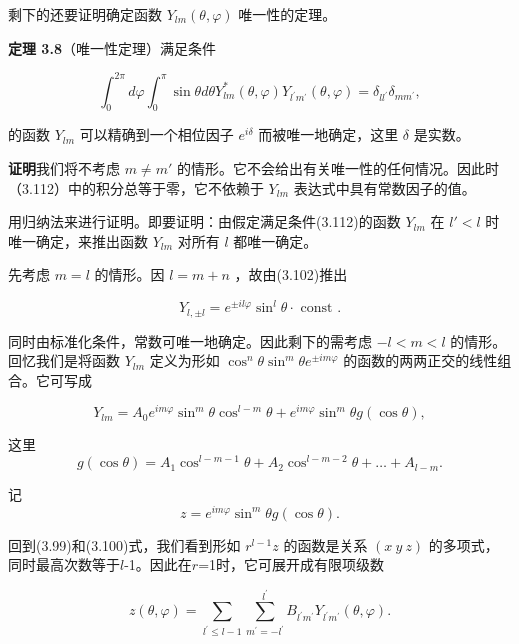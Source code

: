 剩下的还要证明确定函数 $Y_{lm}(\theta, \varphi)$ 唯一性的定理。

\textbf{定理 3.8}\quad （唯一性定理）满足条件

\begin{equation*}
\int_ {0} ^ {2 \pi} d \varphi \int_ {0} ^ {\pi} \sin \theta d \theta Y _ {l m} ^ {*} (\theta , \varphi) Y _ {l ^ {\prime} m ^ {\prime}} (\theta , \varphi) = \delta_ {l l ^ {\prime}} \delta_ {m m ^ {\prime}},\tag{3.112}
\end{equation*}

的函数 $Y_{lm}$ 可以精确到一个相位因子 $e^{i\delta}$ 而被唯一地确定，这里 $\delta$ 是实数。

\textbf{证明}\quad 我们将不考虑 $m \neq m'$ 的情形。它不会给出有关唯一性的任何情况。因此时（3.112）中的积分总等于零，它不依赖于 $Y_{lm}$ 表达式中具有常数因子的值。

用归纳法来进行证明。即要证明：由假定满足条件(3.112)的函数 $Y_{lm}$ 在 $l' < l$ 时唯一确定，来推出函数 $Y_{lm}$ 对所有 $l$ 都唯一确定。

先考虑 $m = l$ 的情形。因 $l = m + n$ ，故由(3.102)推出

\begin{equation*}
Y _ {l, \pm l} = e ^ {\pm i l \varphi} \sin^ {l} \theta \cdot \text { const }.
\end{equation*}

同时由标准化条件，常数可唯一地确定。因此剩下的需考虑 $-l < m < l$ 的情形。回忆我们是将函数 $Y_{lm}$ 定义为形如 $\cos^n\theta \sin^m\theta e^{\pm i m\varphi}$ 的函数的两两正交的线性组合。它可写成

\begin{equation*}
Y _ {l m} = A _ {0} e ^ {i m \varphi} \sin^ {m} \theta \cos^ {l - m} \theta + e ^ {i m \varphi} \sin^ {m} \theta g (\cos \theta),
\end{equation*}

这里
\begin{equation*}
g (\cos \theta) = A _ {1} \cos^ {l - m - 1} \theta + A _ {2} \cos^ {l - m - 2} \theta + \dots + A _ {l - m}.
\end{equation*}

记
\begin{equation*}
z = e ^ {i m \varphi} \sin^ {m} \theta g (\cos \theta).
\end{equation*}

回到(3.99)和(3.100)式，我们看到形如 $r^{l-1}z$ 的函数是关系 $(x\ y\ z)$ 的多项式，同时最高次数等于$l$-1。因此在$r$=1时，它可展开成有限项级数

\begin{equation*}
z (\theta , \varphi) = \sum_ {l ^ {\prime} \leq l - 1} \sum_ {m ^ {\prime} = - l ^ {\prime}} ^ {l ^ {\prime}} B _ {l ^ {\prime} m ^ {\prime}} Y _ {l ^ {\prime} m ^ {\prime}} (\theta , \varphi).\tag{3.119}
\end{equation*}

